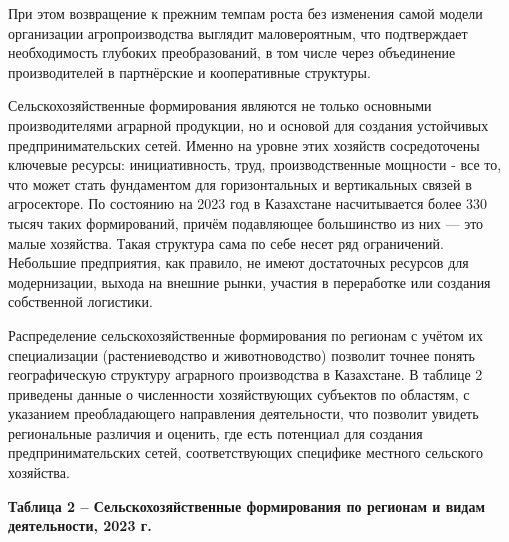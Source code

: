При этом возвращение к прежним темпам роста без изменения самой модели
организации агропроизводства выглядит маловероятным, что подтверждает
необходимость глубоких преобразований, в том числе через объединение
производителей в партнёрские и кооперативные структуры.

Сельскохозяйственные формирования являются не только основными
производителями аграрной продукции, но и основой для создания устойчивых
предпринимательских сетей. Именно на уровне этих хозяйств сосредоточены
ключевые ресурсы: инициативность, труд, производственные мощности - все
то, что может стать фундаментом для горизонтальных и вертикальных связей
в агросекторе. По состоянию на 2023 год в Казахстане насчитывается более
330 тысяч таких формирований, причём подавляющее большинство из них ---
это малые хозяйства. Такая структура сама по себе несет ряд ограничений.
Небольшие предприятия, как правило, не имеют достаточных ресурсов для
модернизации, выхода на внешние рынки, участия в переработке или
создания собственной логистики.

Распределение сельскохозяйственные формирования по регионам с учётом их
специализации (растениеводство и животноводство) позволит точнее понять
географическую структуру аграрного производства в Казахстане. В таблице
2 приведены данные о численности хозяйствующих субъектов по областям, с
указанием преобладающего направления деятельности, что позволит увидеть
региональные различия и оценить, где есть потенциал для создания
предпринимательских сетей, соответствующих специфике местного сельского
хозяйства.

{\bfseries Таблица 2 -- Сельскохозяйственные формирования по регионам и
видам деятельности, 2023 г.}

